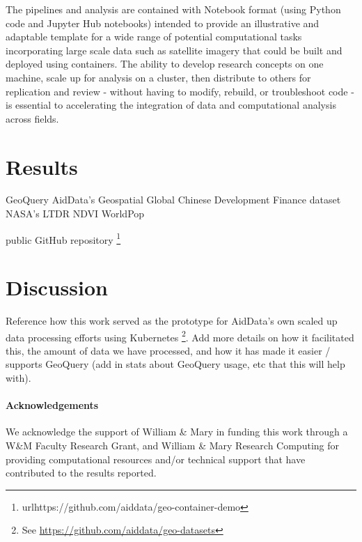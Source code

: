 \documentclass[a4paper]{article}
\begin{document}
The pipelines and analysis are contained with Notebook format (using Python code and Jupyter Hub notebooks) intended to provide an illustrative and adaptable template for a wide range of potential computational tasks incorporating large scale data such as satellite imagery that could be built and deployed using containers. The ability to develop research concepts on one machine, scale up for analysis on a cluster, then distribute to others for replication and review - without having to modify, rebuild, or troubleshoot code - is essential to accelerating the integration of data and computational analysis across fields.


\section{Results}
\lipsum[1]

GeoQuery\citep{Goodman2019}
AidData's Geospatial Global Chinese Development Finance dataset\citep{Goodman2024}
NASA's LTDR NDVI\citep{NASA2023}
WorldPop\citep{WorldPop2018}

public GitHub repository \footnote{url{https://github.com/aiddata/geo-container-demo}}

\section{Discussion}

Reference how this work served as the prototype for AidData's own scaled up data processing efforts using Kubernetes \footnote{See \url{https://github.com/aiddata/geo-datasets}}. Add more details on how it facilitated this, the amount of data we have processed, and how it has made it easier / supports GeoQuery (add in stats about GeoQuery usage, etc that this will help with).


\paragraph{Acknowledgements} 

We acknowledge the support of William \& Mary in funding this work through a W\&M Faculty Research Grant, and William \& Mary Research Computing for providing computational resources and/or technical support that have contributed to the results reported. 


	
\end{document}
